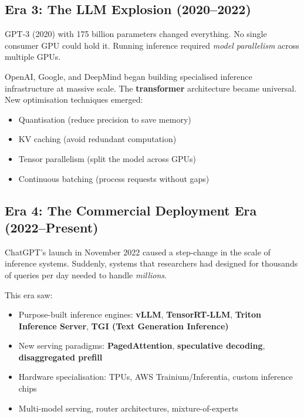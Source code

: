 \documentclass[12pt, twoside, openright]{book}
\newcommand{\term}[1]{\textbf{\color{chaptercolor}#1}}
\begin{document}
\subsection{Era 3: The LLM Explosion (2020--2022)}

GPT-3 (2020) with 175 billion parameters changed everything.
No single consumer GPU could hold it.
Running inference required \textit{model parallelism} across multiple GPUs.

OpenAI, Google, and DeepMind began building specialised inference
infrastructure at massive scale.
The \term{transformer} architecture became universal.
New optimisation techniques emerged:
\begin{itemize}
  \item Quantisation (reduce precision to save memory)
  \item KV caching (avoid redundant computation)
  \item Tensor parallelism (split the model across GPUs)
  \item Continuous batching (process requests without gaps)
\end{itemize}

\subsection{Era 4: The Commercial Deployment Era (2022--Present)}

ChatGPT's launch in November 2022 caused a step-change in the scale
of inference systems. Suddenly, systems that researchers had designed
for thousands of queries per day needed to handle \textit{millions}.

This era saw:
\begin{itemize}
  \item Purpose-built inference engines: \textbf{vLLM}, \textbf{TensorRT-LLM},
        \textbf{Triton Inference Server}, \textbf{TGI (Text Generation Inference)}
  \item New serving paradigms: \term{PagedAttention},
        \term{speculative decoding}, \term{disaggregated prefill}
  \item Hardware specialisation: TPUs, AWS Trainium/Inferentia,
        custom inference chips
  \item Multi-model serving, router architectures, mixture-of-experts
\end{itemize}
\end{document}
